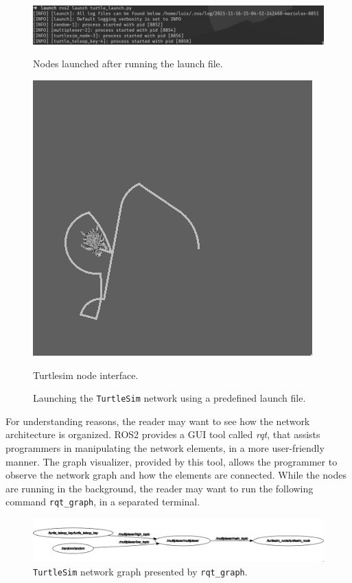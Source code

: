 \begin{figure}[H]
    \centering
    \begin{minipage}{.6\textwidth}
        \centering
        \includegraphics[width=\linewidth]{images/ts_launch_ros.png}
        \caption{Nodes launched after running the launch file.}
        \label{fig:ts-launch-sub}
    \end{minipage}%
    \begin{minipage}{.4\textwidth}
        \centering
        \includegraphics[width=0.5\linewidth]{images/ts_turtle.png}
        \caption{Turtlesim node interface.}
        \label{fig:ts-turtle}
    \end{minipage}

    \caption{Launching the \texttt{TurtleSim} network using a predefined launch file.}
    \label{fig:ts-launch}
\end{figure}

For understanding reasons, the reader may want to see how the network architecture is organized. ROS2 provides a GUI tool called \textit{rqt}, that assists programmers in manipulating the network elements, in a more user-friendly manner. The graph visualizer, provided by this tool, allows the programmer to observe the network graph and how the elements are connected. While the nodes are running in the background, the reader may want to run the following command \texttt{rqt\_graph}, in a separated terminal.

\begin{figure}[H]
        \centering
        \includegraphics[width=\linewidth]{images/ts_rqt_graph.png}
        \caption{\texttt{TurtleSim} network graph presented by \texttt{rqt\_graph}.}
        \label{fig:ts-rqt-graph}
\end{figure}

